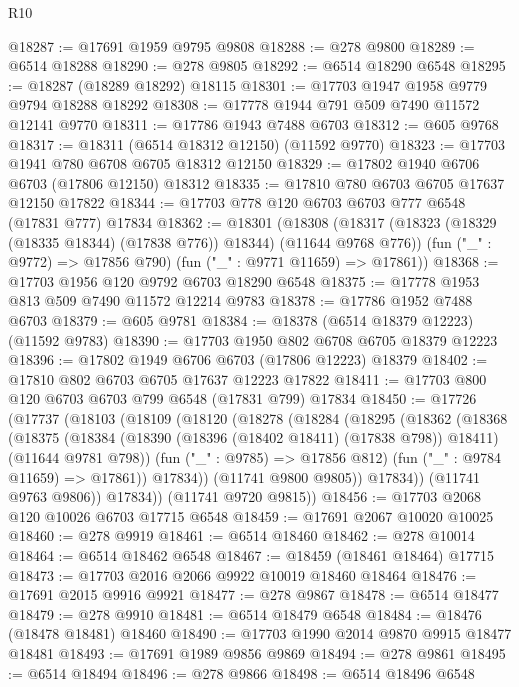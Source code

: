 \begin{lexlean}{R10}
\begin{coremodule}
{{{{{{{{{{{{{{{{{{{{{{{{{{{{{{{{{{{{{{{{{{{{{{{{{{{{{{{{{{{{{{{{{{{{{{{{{{{{{{{{{{{{@18287 := @17691 @1959 @9795 @9808
@18288 := @278 @9800
@18289 := @6514 @18288
@18290 := @278 @9805
@18292 := @6514 @18290 @6548
@18295 := @18287 (@18289 @18292) @18115
@18301 := @17703 @1947 @1958 @9779 @9794 @18288 @18292
@18308 := @17778 @1944 @791 @509 @7490 @11572 @12141 @9770
@18311 := @17786 @1943 @7488 @6703
@18312 := @605 @9768
@18317 := @18311 (@6514 @18312 @12150) (@11592 @9770)
@18323 := @17703 @1941 @780 @6708 @6705 @18312 @12150
@18329 := @17802 @1940 @6706 @6703 (@17806 @12150) @18312
@18335 := @17810 @780 @6703 @6705 @17637 @12150 @17822
@18344 := @17703 @778 @120 @6703 @6703 @777 @6548 (@17831 @777) @17834
@18362 := @18301
    (@18308
      (@18317 (@18323 (@18329 (@18335 @18344) (@17838 @776)) @18344) (@11644 @9768 @776))
      (fun ("_" : @9772) => @17856 @790)
      (fun ("_" : @9771 @11659) => @17861))
@18368 := @17703 @1956 @120 @9792 @6703 @18290 @6548
@18375 := @17778 @1953 @813 @509 @7490 @11572 @12214 @9783
@18378 := @17786 @1952 @7488 @6703
@18379 := @605 @9781
@18384 := @18378 (@6514 @18379 @12223) (@11592 @9783)
@18390 := @17703 @1950 @802 @6708 @6705 @18379 @12223
@18396 := @17802 @1949 @6706 @6703 (@17806 @12223) @18379
@18402 := @17810 @802 @6703 @6705 @17637 @12223 @17822
@18411 := @17703 @800 @120 @6703 @6703 @799 @6548 (@17831 @799) @17834
@18450 := @17726
    (@17737
      (@18103
        (@18109
          (@18120
            (@18278
              (@18284
                (@18295
                  (@18362
                    (@18368
                      (@18375
                        (@18384
                          (@18390 (@18396 (@18402 @18411) (@17838 @798)) @18411)
                          (@11644 @9781 @798))
                        (fun ("_" : @9785) => @17856 @812)
                        (fun ("_" : @9784 @11659) => @17861))
                      @17834))
                  (@11741 @9800 @9805))
                @17834))
            (@11741 @9763 @9806))
          @17834))
      (@11741 @9720 @9815))
@18456 := @17703 @2068 @120 @10026 @6703 @17715 @6548
@18459 := @17691 @2067 @10020 @10025
@18460 := @278 @9919
@18461 := @6514 @18460
@18462 := @278 @10014
@18464 := @6514 @18462 @6548
@18467 := @18459 (@18461 @18464) @17715
@18473 := @17703 @2016 @2066 @9922 @10019 @18460 @18464
@18476 := @17691 @2015 @9916 @9921
@18477 := @278 @9867
@18478 := @6514 @18477
@18479 := @278 @9910
@18481 := @6514 @18479 @6548
@18484 := @18476 (@18478 @18481) @18460
@18490 := @17703 @1990 @2014 @9870 @9915 @18477 @18481
@18493 := @17691 @1989 @9856 @9869
@18494 := @278 @9861
@18495 := @6514 @18494
@18496 := @278 @9866
@18498 := @6514 @18496 @6548
}}}}}}}}}}}}}}}}}}}}}}}}}}}}}}}}}}}}}}}}}}}}}}}}}}}}}}}}}}}}}}}}}}}}}}}}}}}}}}}}}}}}
\end{coremodule}
\end{lexlean}
